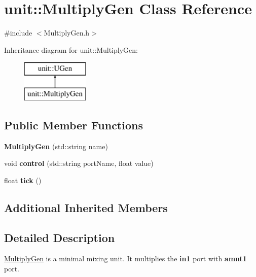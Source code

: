 \hypertarget{classunit_1_1MultiplyGen}{}\section{unit\+:\+:Multiply\+Gen Class Reference}
\label{classunit_1_1MultiplyGen}


{\ttfamily \#include $<$Multiply\+Gen.\+h$>$}

Inheritance diagram for unit\+:\+:Multiply\+Gen\+:\begin{figure}[H]
\begin{center}
\leavevmode
\includegraphics[height=2.000000cm]{classunit_1_1MultiplyGen}
\end{center}
\end{figure}
\subsection*{Public Member Functions}
\begin{DoxyCompactItemize}
\item 
{\bfseries Multiply\+Gen} (std\+::string name)\hypertarget{classunit_1_1MultiplyGen_a8c63aba9e9be634e03f900182b4a1d7a}{}\label{classunit_1_1MultiplyGen_a8c63aba9e9be634e03f900182b4a1d7a}

\item 
void {\bfseries control} (std\+::string port\+Name, float value)\hypertarget{classunit_1_1MultiplyGen_a399981309ef24f24c7044172e58c1e8a}{}\label{classunit_1_1MultiplyGen_a399981309ef24f24c7044172e58c1e8a}

\item 
float {\bfseries tick} ()\hypertarget{classunit_1_1MultiplyGen_abeeb8a84f91375454120639a9bb810fb}{}\label{classunit_1_1MultiplyGen_abeeb8a84f91375454120639a9bb810fb}

\end{DoxyCompactItemize}
\subsection*{Additional Inherited Members}


\subsection{Detailed Description}
\hyperlink{classunit_1_1MultiplyGen}{Multiply\+Gen} is a minimal mixing unit. It multiplies the {\bfseries in1} port with {\bfseries amnt1} port.


